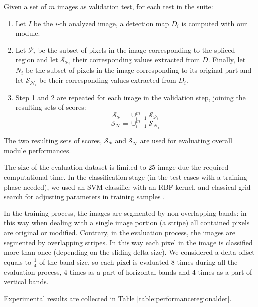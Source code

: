 Given a set of $m$ images as validation test, for each test in the suite:
\begin{enumerate}
\item Let $I$ be the $i$-th analyzed image, a detection map $D_i$ is computed with our module.
\item Let $\mathcal{P}_i$ be the subset of pixels in the image corresponding to the spliced region and let $\mathcal{S}_{\mathcal{P}_i}$ their corresponding values extracted from $D$. Finally, let $N_i$ be the subset of pixels in the image corresponding to its original part and let $\mathcal{S}_{\mathcal{N}_i}$ be their corresponding values extracted from $D_i$.
\item Step 1 and 2 are repeated for each image in the validation step, joining the resulting sets of scores:
$$
\mathcal{S}_{\mathcal{P}} = \cup_{i = 1}^{m} \mathcal{S}_{\mathcal{P}_i}
$$
$$
\mathcal{S}_{\mathcal{N}} = \cup_{i = 1}^{m} \mathcal{S}_{\mathcal{N}_i}
$$
\end{enumerate}

The two resulting sets of scores, $\mathcal{S}_{\mathcal{P}}$ and $\mathcal{S}_{\mathcal{N}}$ are used for evaluating overall module performances.

The size of the evaluation dataset is limited to 25 image due the required computational time. In the classification stage (in the test cases with a training phase needed), we used an SVM classifier with an RBF kernel, and classical grid search for adjusting parameters in training samples \cite{bishop2007pattern}.

In the training process, the images are segmented by non overlapping bands: in this way when dealing with a single image portion (a stripe) all contained pixels are original or modified. Contrary, in the evaluation process, the images are segmented by overlapping stripes. In this way each pixel in the image is classified more than once (depending on the sliding delta size). We considered a delta offset equals to $\frac{1}{4}$ of the band size, so each pixel is evaluated 8 times during all the evaluation process, 4 times as a part of horizontal bands and 4 times as a part of vertical bands.

Experimental results are collected in Table \ref{table:performanceregionaldet}.

